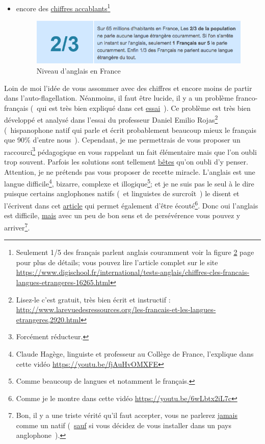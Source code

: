 \begin{itemize}
\begin{figure}[h]
    \label{fig:2}
  \end{figure}
\item encore des
  \href{https://www.digischool.fr/international/tests-anglais/chiffres-cles-francais-langues-etrangeres-16265.html}{chiffres
    accablants}\footnote{Seulement 1/5 des français parlent anglais couramment voir la figure
    \ref{fig:3} page \pageref{fig:3} pour plus de détails; vous pouvez lire l'article complet sur le
    site
    \url{https://www.digischool.fr/international/tests-anglais/chiffres-cles-francais-langues-etrangeres-16265.html}}
   
  \begin{figure}[h]
    \centering
    \caption[L'anglais en France]{Niveau d'anglais en France}\vspace{.1cm}
    \includegraphics[scale=.725]{../img/french-english-level-in-france}
    
    \label{fig:3}
  \end{figure}
\end{itemize}
Loin de moi l'idée de vous assommer avec des chiffres et encore moins
de partir dans l'auto-flagellation. Néanmoins, il faut être lucide, il
y a un problème franco-français (~qui est très bien expliqué dans cet
\href{http://www.larevuedesressources.org/les-francais-et-les-langues-etrangeres,2920.html}{essai}~). 
Ce problème est très bien développé et analysé dans l'essai du
professeur Daniel Emilio Rojas\footnote{Lisez-le c'est gratuit, très
  bien écrit et instructif : \url{http://www.larevuedesressources.org/les-francais-et-les-langues-etrangeres,2920.html}} (~hispanophone natif qui parle et écrit
probablement beaucoup mieux le français que 90\% d'entre
nous~). Cependant, je me permettrais de vous proposer un raccourci\footnote{Forcément réducteur.} pédagogique en vous rappelant un fait
élémentaire mais que l'on oubli trop souvent. Parfois les solutions
sont tellement \underline{bêtes} qu'on oubli d'y penser. Attention, je ne
prétends pas vous proposer de recette miracle. L'anglais est une
langue difficile\footnote{Claude Hagège, linguiste et professeur
  au Collège de France, l'explique dans cette vidéo
  \url{https://youtu.be/fjAuHvOMXFE} }, bizarre, complexe et
illogique\footnote{Comme beaucoup de langues et notamment le
  français.}; et je ne suis pas le seul à le dire puisque certains anglophones natifs (~et
linguistes de surcroît~) le disent et l'écrivent dans cet \href{https://aeon.co/essays/why-is-english-so-weirdly-different-from-other-languages}{article} qui permet également d'être
écouté\footnote{Comme je le montre dans cette vidéo
  \url{https://youtu.be/6wLbtx2iL7c}}. Donc oui l'anglais est
difficile, \underline{mais} avec un peu de bon sens et de persévérence
vous pouvez y arriver\footnote{Bon, il y a une triste vérité qu'il
  faut accepter, vous ne parlerez \underline{jamais} comme un natif (~\underline{sauf}
  si vous décidez de vous installer dans un pays anglophone~).}. 

